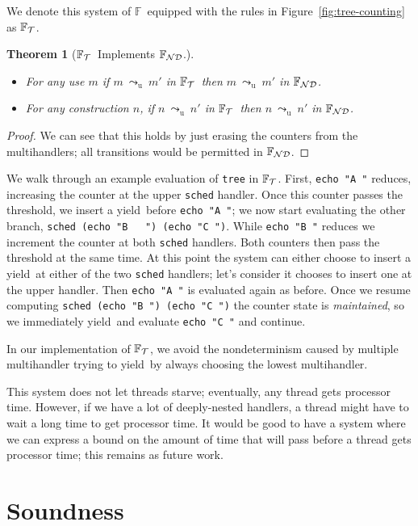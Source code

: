 \documentclass[msc,deptreport,cs]{infthesis} %
\newtheorem{theorem}{Theorem}
\newcommand{\code}[1]{\lstinline{#1}}
\newcommand\nondetfrank{$\mathbb{F}_{\cal{ND}}$}
\newcommand\treefrank{$\mathbb{F}_{\cal{T}}$}
\newcommand\purefrank{$\mathbb{F}$}
\newcommand\yield{\textsf{yield}\xspace}
\newcommand{\todo}[1]
           {{\par\noindent\small\color{RoyalPurple}
  \framebox{\parbox{\dimexpr\linewidth-2\fboxsep-2\fboxrule}
    {\textbf{TODO:} #1}}}}
\newcommand{\redtou}{\leadsto_{\mathrm{u}}}
\begin{document}
We denote this system of \purefrank~equipped with the rules in
Figure~\ref{fig:tree-counting} as \treefrank.

\begin{theorem}[\treefrank~Implements \nondetfrank.]~
\begin{itemize}
\item For any use $m$ if $m~\redtou~m'$ in \treefrank~then $m~\redtou~m'$ in
  \nondetfrank.
\item For any construction $n$, if $n~\redtou~n'$ in \treefrank~then
  $n~\redtou~n'$ in \nondetfrank.
\end{itemize}
\end{theorem}
\begin{proof}
  We can see that this holds by just erasing the counters from the
  multihandlers; all transitions would be permitted in \nondetfrank.
\end{proof}

We walk through an example evaluation of \code{tree} in \treefrank. First,
\code{echo "A "} reduces, increasing the counter at the upper \code{sched}
handler. Once this counter passes the threshold, we insert a \yield~before
\code{echo "A "}; we now start evaluating the other branch, \code{sched (echo "B
  ") (echo "C ")}. While \code{echo "B "} reduces we increment the counter at
both \code{sched} handlers. Both counters then pass the threshold at the same
time. At this point the system can either choose to insert a \yield~at either of
the two \code{sched} handlers; let's consider it chooses to insert one at the
upper handler. Then \code{echo "A "} is evaluated again as before. Once we
resume computing \code{sched (echo "B ") (echo "C ")} the counter state is
\emph{maintained}, so we immediately \yield~and evaluate \code{echo "C "} and
continue.

In our implementation of \treefrank, we avoid the nondeterminism caused by
multiple multihandler trying to \yield~by always choosing the lowest multihandler.

This system does not let threads starve; eventually, any thread gets processor
time. However, if we have a lot of deeply-nested handlers, a thread might have
to wait a long time to get processor time. It would be good to have a system
where we can express a bound on the amount of time that will pass before a
thread gets processor time; this remains as future work.

\todo{Rewrite above.}

\section{Soundness}
\end{document}
